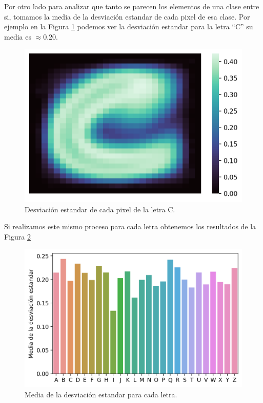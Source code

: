 \documentclass[11pt,a4paper, twocolumn]{article}
\begin{document}
Por otro lado para analizar que tanto se parecen los elementos de una clase entre si, tomamos la media de la desviación estandar de cada pixel de esa clase. Por ejemplo en la Figura \ref{fig:5a} podemos ver la desviación estandar para la letra ``C'' su media es $\approx 0.20$.

\begin{figure}[H]
	\centering
	\includegraphics[scale=0.8]{figuras/5a.png}
	\caption{Desviación estandar de cada pixel de la letra C.}
	\label{fig:5a}
\end{figure}

Si realizamos este mismo proceso para cada letra obtenemos los resultados de la Figura \ref{fig:6a}

\begin{figure}[H]
	\centering
	\includegraphics[scale=0.8]{figuras/6a.png}
	\caption{Media de la desviación estandar para cada letra.}
	\label{fig:6a}
\end{figure}
\end{document}
